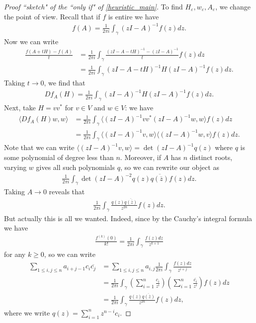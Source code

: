 \begin{proof}[Proof ``sketch" of the ``only if" of \ref{heuristic_main}]
	To find $H_{\varepsilon}, w_{\varepsilon}, A_{\varepsilon}$, we change the point of view. Recall that if $f$ is entire we have
	\begin{align*}
	f(A) = \frac{1}{2 \pi i}\int_{\gamma} (z I - A)^{-1} f(z) dz.
	\end{align*}
	Now we can write
	\begin{align*}
		\frac{f(A + t H) - f(A)}{t} &= \frac{1}{2 \pi i}\int_{\gamma} \frac{(z I - A - t H)^{-1} - (z I - A)^{-1}}{t} f(z) dz \\
		&= \frac{1}{2 \pi i}\int_{\gamma} (z I - A - t H)^{-1} H (z I - A)^{-1} f(z) dz.
	\end{align*}
	Taking $t \to 0$, we find that
	\begin{align*}
		D f_{A}(H) = \frac{1}{2 \pi i}\int_{\gamma} (z I - A)^{-1} H (z I - A)^{-1} f(z) dz.
	\end{align*}
	Next, take $H = v v^{*}$ for $v \in V$ and $w \in V$: we have
	\begin{align*}
		\langle D f_{A}(H) w, w \rangle &= \frac{1}{2 \pi i}\int_{\gamma} \langle (z I - A)^{-1} v v^{*} (z I - A)^{-1} w, w \rangle f(z) dz \\
		&= \frac{1}{2 \pi i}\int_{\gamma} \langle (z I - A)^{-1} v, w \rangle \langle (z I - A)^{-1} w, v \rangle f(z) dz.
	\end{align*}
	Note that we can write $\langle (z I - A)^{-1} v, w \rangle = \det(z I - A)^{-1} q(z)$ where $q$ is some polynomial of degree less than $n$. Moreover, if $A$ has $n$ distinct roots, varying $w$ gives all such polynomials $q$, so we can rewrite our object as
	\begin{align*}
		\frac{1}{2 \pi i}\int_{\gamma} \det(z I - A)^{-2} q(z) \overline{q(\overline{z})} f(z) dz.
	\end{align*}
	Taking $A \to 0$ reveals that
	\begin{align*}
		\frac{1}{2 \pi i}\int_{\gamma} \frac{q(z) \overline{q(\overline{z})}}{z^{2 n}} f(z) dz.
	\end{align*}
	But actually this is all we wanted. Indeed, since by the Cauchy's integral formula we have
	\begin{align*}
		\frac{f^{(k)}(0)}{k!} = \frac{1}{2 \pi i} \int_{\gamma} \frac{f(z) d z}{z^{k + 1}}
	\end{align*}
	for any $k \geq 0$, so we can write
	\begin{align*}
		\sum_{1 \leq i, j \leq n} a_{i + j - 1} c_{i} \overline{c_{j}} &= \sum_{1 \leq i, j \leq n} a_{i, j} \frac{1}{2 \pi i} \int_{\gamma} \frac{f(z) d z}{z^{i + j}} \\
		&= \frac{1}{2 \pi i} \int_{\gamma} \left(\sum_{i = 1}^{n} \frac{c_{i}}{z^{i}} \right) \left(\sum_{i = 1}^{n} \frac{\overline{c_{i}}}{z^{i}} \right)f(z) dz \\
		&= \frac{1}{2 \pi i} \int_{\gamma}  \frac{q(z) \overline{q(\overline{z})}}{z^{2 n}} f(z) dz,
	\end{align*}
	where we write $q(z) = \sum_{i = 1}^{n} z^{n - i} c_{i}$.
\end{proof}

